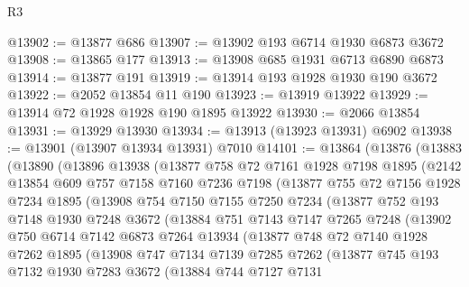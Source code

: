 \begin{lexlean}{R3}
\begin{coremodule}
@13902 := @13877 @686
@13907 := @13902 @193 @6714 @1930 @6873 @3672
@13908 := @13865 @177
@13913 := @13908 @685 @1931 @6713 @6890 @6873
@13914 := @13877 @191
@13919 := @13914 @193 @1928 @1930 @190 @3672
@13922 := @2052 @13854 @11 @190
@13923 := @13919 @13922
@13929 := @13914 @72 @1928 @1928 @190 @1895 @13922
@13930 := @2066 @13854
@13931 := @13929 @13930
@13934 := @13913 (@13923 @13931) @6902
@13938 := @13901 (@13907 @13934 @13931) @7010
@14101 := @13864
    (@13876
      (@13883
        (@13890
          (@13896
            @13938
            (@13877
              @758
              @72
              @7161
              @1928
              @7198
              @1895
              (@2142
                @13854
                @609
                @757
                @7158
                @7160
                @7236
                @7198
                (@13877
                  @755
                  @72
                  @7156
                  @1928
                  @7234
                  @1895
                  (@13908
                    @754
                    @7150
                    @7155
                    @7250
                    @7234
                    (@13877
                      @752
                      @193
                      @7148
                      @1930
                      @7248
                      @3672
                      (@13884
                        @751
                        @7143
                        @7147
                        @7265
                        @7248
                        (@13902
                          @750
                          @6714
                          @7142
                          @6873
                          @7264
                          @13934
                          (@13877
                            @748
                            @72
                            @7140
                            @1928
                            @7262
                            @1895
                            (@13908
                              @747
                              @7134
                              @7139
                              @7285
                              @7262
                              (@13877
                                @745
                                @193
                                @7132
                                @1930
                                @7283
                                @3672
                                (@13884
                                  @744
                                  @7127
                                  @7131

\end{coremodule}
\end{lexlean}
